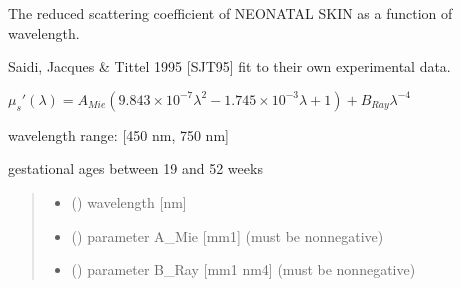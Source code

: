 \documentclass[letterpaper,10pt,english]{sphinxmanual}
\begin{document}

\begin{fulllineitems}
\label{\detokenize{04_scattering_coefficient:skinoptics.scattering_coefficient.rmus_Saidi}}
\pysigstartsignatures
{}
\pysigstopsignatures
\begin{DUlineblock}{0em}
\item[] The reduced scattering coefficient of NEONATAL SKIN as a function of wavelength.
\item[] Saidi, Jacques \& Tittel 1995 {[}SJT95{]} fit to their own experimental data.
\end{DUlineblock}

\sphinxAtStartPar
\(\mu_s'(\lambda) = A_{Mie} ( 9.843 \times 10^{-7} \lambda^2 - 1.745 \times 10^{-3} \lambda + 1) + B_{Ray} \lambda^{-4}\)

\begin{DUlineblock}{0em}
\item[] wavelength range: {[}450 nm, 750 nm{]}
\item[] gestational ages between 19 and 52 weeks
\end{DUlineblock}
\begin{quote}\begin{description}
\begin{itemize}
\item {} 
\sphinxAtStartPar
{} () \textendash{} wavelength {[}nm{]}

\item {} 
\sphinxAtStartPar
{} () \textendash{} parameter A\_Mie {[}mm\sphinxhyphen{}1{]} (must be nonnegative)

\item {} 
\sphinxAtStartPar
{} () \textendash{} parameter B\_Ray {[}mm\sphinxhyphen{}1 nm4{]} (must be nonnegative)


\end{itemize}
\end{description}
\end{quote}
\end{fulllineitems}
\end{document}
